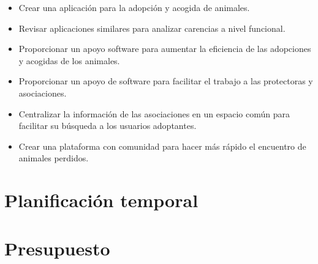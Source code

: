 \begin{itemize}
	\item Crear una aplicación para la adopción y acogida de animales. %
	\item Revisar aplicaciones similares para analizar carencias a nivel funcional. %
	\item Proporcionar un apoyo software para aumentar la eficiencia de las adopciones y acogidas de los animales. %
	\item Proporcionar un apoyo de software para facilitar el trabajo a las protectoras y asociaciones.
	\item Centralizar la información de las asociaciones en un espacio común para facilitar su búsqueda a los usuarios adoptantes.
	\item Crear una plataforma con comunidad para hacer más rápido el encuentro de animales perdidos.
	
\end{itemize}

\section{Planificación temporal}

\section{Presupuesto}
